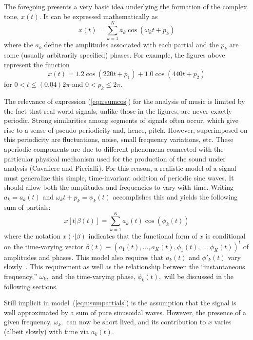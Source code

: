The foregoing presents a very basic idea underlying the formation of the
complex tone, $x(t)$.  It can be expressed mathematically as
\begin{equation}
\label{eqn:sumcos}
x(t) = \sum_{k=1}^K a_k \cos(\omega_k t + p_k)
\end{equation}
where the $a_k$ define the amplitudes associated with each partial and
the $p_k$ are some (usually arbitrarily specified) phases.  For
example, the figures above represent the function
\[x(t) = 1.2 \cos(220 t + p_1) + 1.0 \cos(440 t + p_2)\]
for $0 < t \leq (0.04)2\pi $ and $0 < p_k \leq 2\pi$.

The relevance of expression (\ref{eqn:sumcos}) for the analysis of
music is limited by the fact that real world signals, unlike those in
the figures, are never exactly periodic.  Strong similarities among
segments of signals often occur, which give rise to a sense of
pseudo-periodicity and, hence, pitch. However, superimposed on this
periodicity are fluctuations, noise, small frequency variations, etc.
These aperiodic components are due to different phenomena connected
with the particular physical mechanism used for the production of the
sound under analysis (Cavaliere and Piccialli).  For this reason, a
realistic model of a signal must generalize this simple,
time-invariant addition of periodic sine waves.  It should allow both
the amplitudes and frequencies to vary with time.  Writing 
$a_k = a_k(t)$ and $\omega_k t + p_k = \phi_k(t)$ accomplishes this
and yields the 
following sum of partials:
\begin{equation}
\label{eqn:sumpartials}
x[t|\beta(t)] = \sum_{k=1}^K a_k(t) \cos(\phi_k(t))
\end{equation}
where the notation $x(\cdot|\beta)$ indicates that the
functional form of $x$ is conditional on the time-varying vector
$\beta(t) \equiv (a_1(t),\ldots,a_K(t),\phi_1(t),\ldots,\phi_K(t))^t$ of
amplitudes and phases.  This model also requires
that $a_k(t)$ and $\phi'_k(t)$ vary slowly~\cite{Rodet:1992}.  This
requirement as well as the relationship between the ``instantaneous
frequency,'' $\omega_k,$ and the time-varying phase, $\phi_k(t),$ will
be discussed in the following sections. 

Still implicit in model~(\ref{eqn:sumpartials}) is the assumption that
the signal is well approximated by a sum of pure sinusoidal waves.  
However, the presence of a given frequency, $\omega_k,$ can now be
short lived, and its contribution to $x$ varies (albeit slowly) with
time via $a_k(t)$.   

